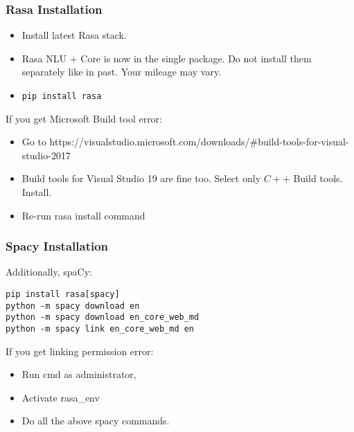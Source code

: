  \begin{frame}[fragile]\frametitle{Rasa Installation}
\begin{itemize}
\item Install latest Rasa stack.
\item Rasa NLU $+$ Core is now in the single package. Do not install them separately like in past. Your mileage may vary.
\item \lstinline|pip install rasa|
\end{itemize}

If you get Microsoft Build tool error:
\begin{itemize}
\item Go to https://visualstudio.microsoft.com/downloads/\#build-tools-for-visual-studio-2017
\item Build tools for Visual Studio 19 are fine too. Select only $C++$ Build tools. Install.
\item Re-run rasa install command
\end{itemize}
 
\end{frame}

 \begin{frame}[fragile]\frametitle{Spacy Installation}
 Additionally, spaCy:
\begin{lstlisting}
pip install rasa[spacy]
python -m spacy download en
python -m spacy download en_core_web_md
python -m spacy link en_core_web_md en
\end{lstlisting}

If you get linking permission error:
\begin{itemize}
\item Run cmd as administrator, 
\item Activate rasa\_env
\item Do all the above spacy commands.
\end{itemize}
 
\end{frame}


